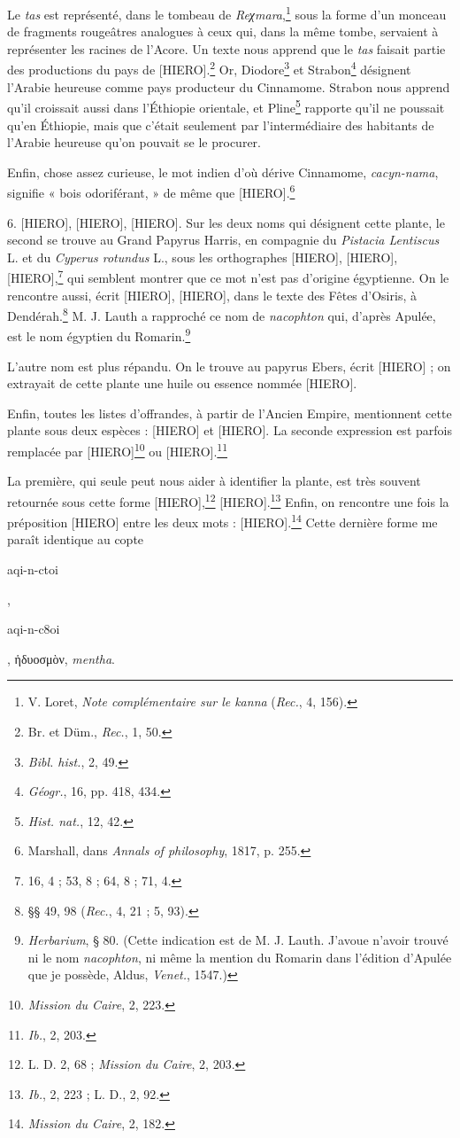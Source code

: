 \documentclass[a4paper, 11pt, oneside, landscape]{article}
\begin{document}
Le \emph{tas} est représenté, dans le tombeau de \emph{Reχmara},\footnote{V. Loret, \emph{Note complémentaire sur le kanna} (\emph{Rec.}, 4, 156).} sous la forme d'un monceau de fragments rougeâtres analogues à ceux qui, dans la même tombe, servaient à représenter les racines de l'Acore. Un texte nous apprend que le \emph{tas} faisait partie des productions du pays de [HIERO].\footnote{Br. et Düm., \emph{Rec.}, 1, 50.} Or, Diodore\footnote{\emph{Bibl. hist.}, 2, 49.} et Strabon\footnote{\emph{Géogr.}, 16, pp. 418, 434.} désignent l'Arabie heureuse comme pays producteur du Cinnamome. Strabon nous apprend qu'il croissait aussi dans l'Éthiopie orientale, et Pline\footnote{\emph{Hist. nat.}, 12, 42.} rapporte qu'il ne poussait qu'en Éthiopie, mais que c'était seulement par l'intermédiaire des habitants de l'Arabie heureuse qu'on pouvait se le procurer.

Enfin, chose assez curieuse, le mot indien d'où dérive Cinnamome, \emph{cacyn-nama}, signifie « bois odoriférant, » de même que [HIERO].\footnote{Marshall, dans \emph{Annals of philosophy}, 1817, p. 255.}

6. [HIERO], [HIERO], [HIERO]. Sur les deux noms qui désignent cette plante, le second se trouve au Grand Papyrus Harris, en compagnie du \emph{Pistacia Lentiscus} L. et du \emph{Cyperus rotundus} L., sous les orthographes [HIERO], [HIERO], [HIERO],\footnote{16, 4 ; 53, 8 ; 64, 8 ; 71, 4.} qui semblent montrer que ce mot n'est pas d'origine égyptienne. On le rencontre aussi, écrit [HIERO], [HIERO], dans le texte des Fêtes d'Osiris, à Dendérah.\footnote{§§ 49, 98 (\emph{Rec.}, 4, 21 ; 5, 93).} M. J. Lauth a rapproché ce nom de \emph{nacophton} qui, d'après Apulée, est le nom égyptien du Romarin.\footnote{\emph{Herbarium}, § 80. (Cette indication est de M. J. Lauth. J'avoue n'avoir trouvé ni le nom \emph{nacophton}, ni même la mention du Romarin dans l'édition d'Apulée que je possède, Aldus, \emph{Venet.}, 1547.)}

L'autre nom est plus répandu. On le trouve au papyrus Ebers, écrit [HIERO] ; on extrayait de cette plante une huile ou essence nommée [HIERO].

Enfin, toutes les listes d'offrandes, à partir de l'Ancien Empire, mentionnent cette plante sous deux espèces : [HIERO] et [HIERO]. La seconde expression est parfois remplacée par [HIERO]\footnote{\emph{Mission du Caire}, 2, 223.} ou [HIERO].\footnote{\emph{Ib.}, 2, 203.}

La première, qui seule peut nous aider à identifier la plante, est très souvent retournée sous cette forme [HIERO],\footnote{L. D. 2, 68 ; \emph{Mission du Caire}, 2, 203.} [HIERO].\footnote{\emph{Ib.}, 2, 223 ; L. D., 2, 92.} Enfin, on rencontre une fois la préposition [HIERO] entre les deux mots : [HIERO].\footnote{\emph{Mission du Caire}, 2, 182.} Cette dernière forme me paraît identique au copte \begin{coptic}aqi-n-ctoi\end{coptic}, \begin{coptic}aqi-n-c8oi\end{coptic}, ἡδυοσμὸν, \emph{mentha}.
\end{document}
